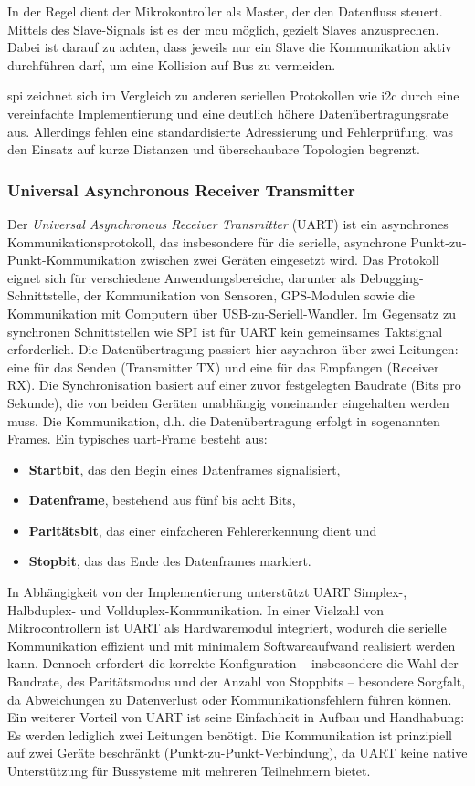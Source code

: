 In der Regel dient der Mikrokontroller als Master, der den Datenfluss steuert.
Mittels des Slave-Signals ist es der \gls{mcu} möglich, gezielt Slaves anzusprechen.
Dabei ist darauf zu achten, dass jeweils nur ein Slave die Kommunikation aktiv durchführen darf, um eine Kollision auf Bus zu vermeiden.

\gls{spi} zeichnet sich im Vergleich zu anderen seriellen Protokollen wie \gls{i2c} durch eine vereinfachte Implementierung und eine deutlich höhere Datenübertragungsrate aus. 
Allerdings fehlen eine standardisierte Adressierung und Fehlerprüfung, was den Einsatz auf kurze Distanzen und überschaubare Topologien begrenzt. 


\subsubsection*{Universal Asynchronous Receiver Transmitter}
Der \emph{Universal Asynchronous Receiver Transmitter} (UART) ist ein asynchrones Kommunikationsprotokoll, das insbesondere für die serielle, asynchrone Punkt-zu-Punkt-Kommunikation zwischen zwei Geräten eingesetzt wird. 
Das Protokoll eignet sich für verschiedene Anwendungsbereiche, darunter als Debugging-Schnittstelle, der Kommunikation von Sensoren, GPS-Modulen sowie die Kommunikation mit Computern über USB-zu-Seriell-Wandler. 
Im Gegensatz zu synchronen Schnittstellen wie SPI ist für UART kein gemeinsames Taktsignal erforderlich.
Die Datenübertragung passiert hier asynchron über zwei Leitungen: eine für das Senden (Transmitter TX) und eine für das Empfangen (Receiver RX).
Die Synchronisation basiert auf einer zuvor festgelegten Baudrate (Bits pro Sekunde), die von beiden Geräten unabhängig voneinander eingehalten werden muss.
Die Kommunikation, d.h. die Datenübertragung erfolgt in sogenannten Frames. Ein typisches \gls{uart}-Frame besteht aus:
\begin{itemize}
	\item \textbf{Startbit}, das den Begin eines Datenframes signalisiert,
	\item \textbf{Datenframe}, bestehend aus fünf bis acht Bits,
	\item \textbf{Paritätsbit}, das einer einfacheren Fehlererkennung dient und
	\item \textbf{Stopbit}, das das Ende des Datenframes markiert.
\end{itemize}

In Abhängigkeit von der Implementierung unterstützt UART Simplex-, Halbduplex- und Vollduplex-Kommunikation. 
In einer Vielzahl von Mikrocontrollern ist UART als Hardwaremodul integriert, wodurch die serielle Kommunikation effizient und mit minimalem Softwareaufwand realisiert werden kann. 
Dennoch erfordert die korrekte Konfiguration – insbesondere die Wahl der Baudrate, des Paritätsmodus und der Anzahl von Stoppbits – besondere Sorgfalt, da Abweichungen zu Datenverlust oder Kommunikationsfehlern führen können.
Ein weiterer Vorteil von UART ist seine Einfachheit in Aufbau und Handhabung: Es werden lediglich zwei Leitungen benötigt. 
Die Kommunikation ist prinzipiell auf zwei Geräte beschränkt (Punkt-zu-Punkt-Verbindung), da UART keine native Unterstützung für Bussysteme mit mehreren Teilnehmern bietet.

